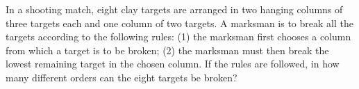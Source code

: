 In a shooting match, eight clay targets are arranged in two hanging columns of three targets each and one column of two targets. A marksman is to break all the targets according to the following rules: (1) the marksman first chooses a column from which a target is to be broken; (2) the marksman must then break the lowest remaining target in the chosen column. If the rules are followed, in how many different orders can the eight targets be broken?
